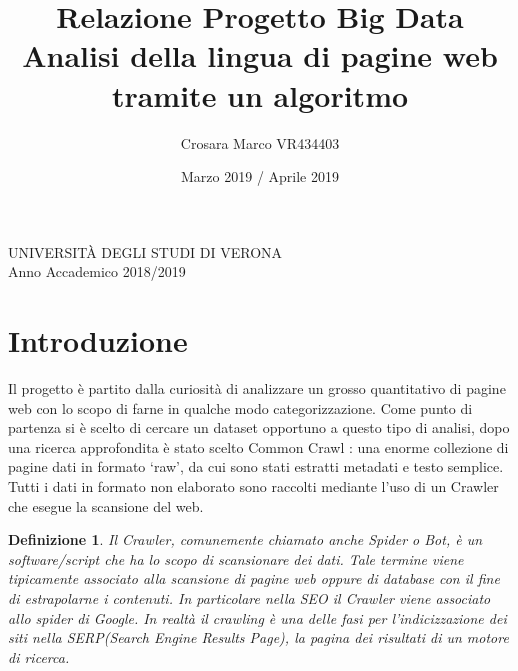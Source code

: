 \documentclass{article}
\title{Relazione Progetto Big Data\\Analisi della lingua di pagine web\\tramite un algoritmo \MR}
\author{Crosara Marco VR434403}
\date{Marzo 2019 / Aprile 2019}
\newcommand{\CC}{Common Crawl }
\newtheorem*{definition}{Definizione}
\begin{document}
\maketitle
\thispagestyle{empty}

\vspace{\fill}

\begin{center}
  UNIVERSITÀ DEGLI STUDI DI VERONA\\
Anno Accademico 2018/2019
\end{center}

\newpage

\tableofcontents
\thispagestyle{empty}

\newpage



\section{Introduzione}

Il progetto è partito dalla curiosità di analizzare un grosso quantitativo di pagine web con lo scopo di farne in qualche modo categorizzazione. Come punto di partenza si è scelto di cercare un dataset opportuno a questo tipo di analisi, dopo una ricerca approfondita è stato scelto \CC\cite{commoncrawl}: una enorme collezione di pagine dati in formato `raw', da cui sono stati estratti metadati e testo semplice. Tutti i dati in formato non elaborato sono raccolti mediante l'uso di un Crawler che esegue la scansione del web.

\begin{definition}
Il Crawler, comunemente chiamato anche Spider o Bot, è un software/script che ha lo scopo di scansionare dei dati. Tale termine viene tipicamente associato alla scansione di pagine web oppure di database con il fine di estrapolarne i contenuti. In particolare nella SEO il Crawler viene associato allo spider di Google. In realtà il crawling è una delle fasi per l’indicizzazione dei siti nella SERP(Search Engine Results Page), la pagina dei risultati di un motore di ricerca.
\end{definition}
\end{document}
